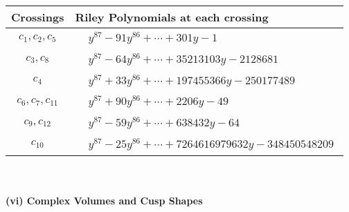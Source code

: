 \documentclass[1p]{elsarticle_modified}
\theoremstyle{definition}
\begin{document}
\begin{tabular}{m{50pt}|m{274pt}}
Crossings & \hspace{64pt}Riley Polynomials at each crossing \\
\hline $$\begin{aligned}c_{1},c_{2},c_{5}\end{aligned}$$&$\begin{aligned}
&y^{87}-91 y^{86}+\cdots+301 y-1
\end{aligned}$\\
\hline $$\begin{aligned}c_{3},c_{8}\end{aligned}$$&$\begin{aligned}
&y^{87}-64 y^{86}+\cdots+35213103 y-2128681
\end{aligned}$\\
\hline $$\begin{aligned}c_{4}\end{aligned}$$&$\begin{aligned}
&y^{87}+33 y^{86}+\cdots+197455366 y-250177489
\end{aligned}$\\
\hline $$\begin{aligned}c_{6},c_{7},c_{11}\end{aligned}$$&$\begin{aligned}
&y^{87}+90 y^{86}+\cdots+2206 y-49
\end{aligned}$\\
\hline $$\begin{aligned}c_{9},c_{12}\end{aligned}$$&$\begin{aligned}
&y^{87}-59 y^{86}+\cdots+638432 y-64
\end{aligned}$\\
\hline $$\begin{aligned}c_{10}\end{aligned}$$&$\begin{aligned}
&y^{87}-25 y^{86}+\cdots+7264616979632 y-348450548209
\end{aligned}$\\
\hline
\end{tabular}\\~\\
\newpage\flushleft \textbf{(vi) Complex Volumes and Cusp Shapes}
\end{document}
